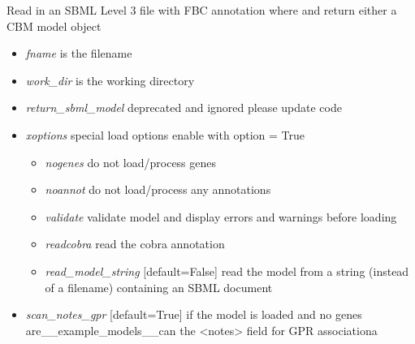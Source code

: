\documentclass[a4paper,11pt,english]{sphinxmanual}
\begin{document}
\begin{fulllineitems}
\label{modules_doc:cbmpy.CBRead.readSBML3FBC}
Read in an SBML Level 3 file with FBC annotation where and return either a CBM model object
\begin{itemize}
\item {} 
\emph{fname} is the filename

\item {} 
\emph{work\_dir} is the working directory

\item {} 
\emph{return\_sbml\_model} deprecated and ignored please update code

\item {} 
\emph{xoptions} special load options enable with option = True
\begin{itemize}
\item {} 
\emph{nogenes} do not load/process genes

\item {} 
\emph{noannot} do not load/process any annotations

\item {} 
\emph{validate} validate model and display errors and warnings before loading

\item {} 
\emph{readcobra} read the cobra annotation

\item {} 
\emph{read\_model\_string} {[}default=False{]} read the model from a string (instead of a filename) containing an SBML document

\end{itemize}

\end{itemize}
\begin{itemize}
\item {} 
\emph{scan\_notes\_gpr} {[}default=True{]} if the model is loaded and no genes are\_\_example\_models\_\_can the \textless{}notes\textgreater{} field for GPR associationa

\end{itemize}

\end{fulllineitems}

\end{document}
